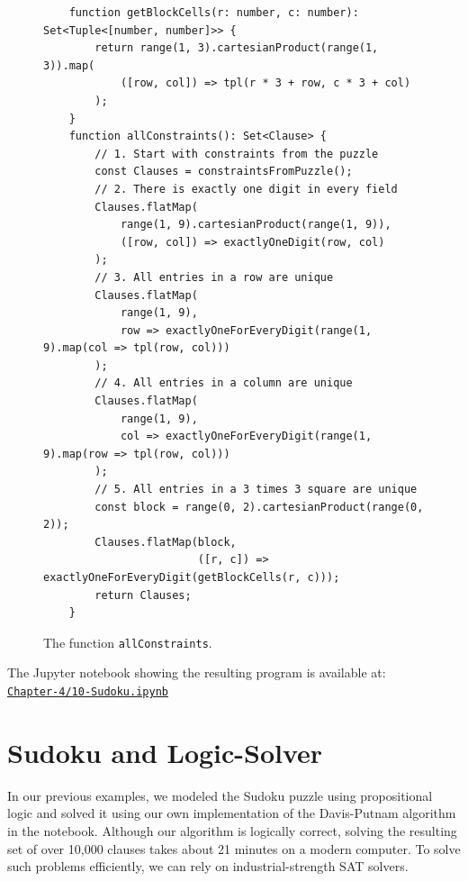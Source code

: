 \begin{figure}[!ht]
\centering
\begin{verbatim}
    function getBlockCells(r: number, c: number): Set<Tuple<[number, number]>> {
        return range(1, 3).cartesianProduct(range(1, 3)).map(
            ([row, col]) => tpl(r * 3 + row, c * 3 + col)
        );
    }
    function allConstraints(): Set<Clause> {
        // 1. Start with constraints from the puzzle
        const Clauses = constraintsFromPuzzle();
        // 2. There is exactly one digit in every field
        Clauses.flatMap(
            range(1, 9).cartesianProduct(range(1, 9)), 
            ([row, col]) => exactlyOneDigit(row, col)
        );
        // 3. All entries in a row are unique
        Clauses.flatMap(
            range(1, 9), 
            row => exactlyOneForEveryDigit(range(1, 9).map(col => tpl(row, col)))
        );
        // 4. All entries in a column are unique
        Clauses.flatMap(
            range(1, 9), 
            col => exactlyOneForEveryDigit(range(1, 9).map(row => tpl(row, col)))
        );
        // 5. All entries in a 3 times 3 square are unique
        const block = range(0, 2).cartesianProduct(range(0, 2));
        Clauses.flatMap(block,
                        ([r, c]) => exactlyOneForEveryDigit(getBlockCells(r, c)));
        return Clauses;
    }  
\end{verbatim}
\vspace*{-0.3cm}
\caption{The function \texttt{allConstraints}.}
\label{fig:sudoku-allConstraints}
\end{figure}
The Jupyter notebook showing the resulting program is available at:
\\[0.2cm]
\hspace*{1.3cm}
\href{https://github.com/karlstroetmann/Logic/blob/master/TypeScript/Chapter-4/10-Sudoku.ipynb}{\texttt{Chapter-4/10-Sudoku.ipynb}}

\FloatBarrier

\section{Sudoku and Logic-Solver}
In our previous examples, we modeled the Sudoku puzzle using propositional logic and solved it using our own
implementation of the Davis-Putnam algorithm in the notebook. Although our algorithm
is logically correct, solving the resulting set of over 10,000 clauses takes about 21 minutes on a modern
computer. To solve such problems efficiently, we can rely on industrial-strength SAT solvers. 


